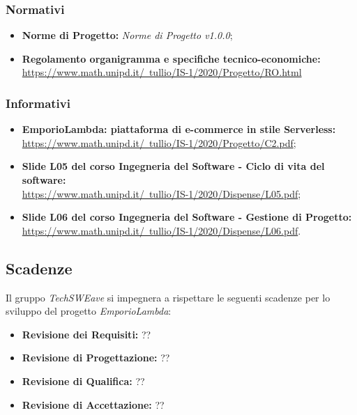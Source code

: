         \subsubsection{Normativi}
        \begin{itemize}
            \item \textbf{Norme di Progetto: } \emph{Norme di Progetto v1.0.0};
            \item \textbf{Regolamento organigramma e specifiche tecnico-economiche: } \\ \href{https://www.math.unipd.it/~tullio/IS-1/2020/Progetto/RO.html}{https://www.math.unipd.it/~tullio/IS-1/2020/Progetto/RO.html}
        \end{itemize}
        \subsubsection{Informativi}
        \begin{itemize}
            \item \textbf{EmporioLambda: piattaforma di e-commerce in stile Serverless: } \\ \href{https://www.math.unipd.it/~tullio/IS-1/2020/Progetto/C2.pdf}{https://www.math.unipd.it/~tullio/IS-1/2020/Progetto/C2.pdf};
            \item \textbf{Slide L05 del corso Ingegneria del Software - Ciclo di vita del software: } \\ \href{https://www.math.unipd.it/~tullio/IS-1/2020/Dispense/L05.pdf}{https://www.math.unipd.it/~tullio/IS-1/2020/Dispense/L05.pdf};
            \item \textbf{Slide L06 del corso Ingegneria del Software - Gestione di Progetto: } \\ \href{https://www.math.unipd.it/~tullio/IS-1/2020/Dispense/L06.pdf}{https://www.math.unipd.it/~tullio/IS-1/2020/Dispense/L06.pdf}.
        \end{itemize}
    \subsection{Scadenze}
    \label{sec:scadenze}
    Il gruppo \emph{TechSWEave} si impegnera a rispettare le seguenti scadenze per lo sviluppo del progetto \emph{EmporioLambda}:
    \begin{itemize}
        \item \textbf{Revisione dei Requisiti: }??
        \item \textbf{Revisione di Progettazione: }??
        \item \textbf{Revisione di Qualifica: }??
        \item \textbf{Revisione di Accettazione: }??
    \end{itemize}
